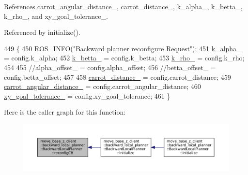 References carrot\+\_\+angular\+\_\+distance\+\_\+, carrot\+\_\+distance\+\_\+, k\+\_\+alpha\+\_\+, k\+\_\+betta\+\_\+, k\+\_\+rho\+\_\+, and xy\+\_\+goal\+\_\+tolerance\+\_\+.



Referenced by initialize().


\begin{DoxyCode}
449 \{
450     ROS\_INFO(\textcolor{stringliteral}{"Backward planner reconfigure Request"});
451     \hyperlink{classmove__base__z__client_1_1backward__local__planner_1_1BackwardLocalPlanner_ac859500c0329247de08daf864fd2d4b1}{k\_alpha\_} = config.k\_alpha;
452     \hyperlink{classmove__base__z__client_1_1backward__local__planner_1_1BackwardLocalPlanner_aa2f7fe022cdc4eb11c17f6f576c732c6}{k\_betta\_} = config.k\_betta;
453     \hyperlink{classmove__base__z__client_1_1backward__local__planner_1_1BackwardLocalPlanner_a9ae9a8c4c4663a999ba107aea9f6868d}{k\_rho\_} = config.k\_rho;
454 
455     \textcolor{comment}{//alpha\_offset\_ = config.alpha\_offset;}
456     \textcolor{comment}{//betta\_offset\_ = config.betta\_offset;}
457 
458     \hyperlink{classmove__base__z__client_1_1backward__local__planner_1_1BackwardLocalPlanner_a6dc3aa0ff63f9f7d0aae852755734b5d}{carrot\_distance\_} = config.carrot\_distance;
459     \hyperlink{classmove__base__z__client_1_1backward__local__planner_1_1BackwardLocalPlanner_a3d6cba0748b85a67f5dfd7740de9530f}{carrot\_angular\_distance\_} = config.carrot\_angular\_distance;
460     \hyperlink{classmove__base__z__client_1_1backward__local__planner_1_1BackwardLocalPlanner_a89ab1ee7283a474dc19970789f51c087}{xy\_goal\_tolerance\_} = config.xy\_goal\_tolerance;
461 \}
\end{DoxyCode}
Here is the caller graph for this function\+:
\nopagebreak
\begin{figure}[H]
\begin{center}
\leavevmode
\includegraphics[width=350pt]{classmove__base__z__client_1_1backward__local__planner_1_1BackwardLocalPlanner_a9dfe3fd3fd7a0c8ec414a78e1300d09c_icgraph}
\end{center}
\end{figure}
\mbox{\label{classmove__base__z__client_1_1backward__local__planner_1_1BackwardLocalPlanner_a3b552c90996d21cadf7b2f0875706407}} 
